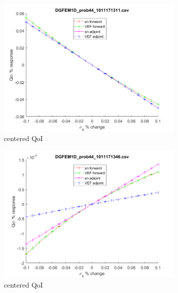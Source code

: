 \documentclass[12pt]{report}
\begin{document}
\begin{figure}[H]
\\
\begin{subfigure}{.5\textwidth}
  \centering
  \includegraphics[width=.98\linewidth]{figures/44sigaSens.png}
  \caption{centered QoI}
  \label{fig:sfig2}
\end{subfigure}%
\begin{subfigure}{.5\textwidth}
  \centering
  \includegraphics[width=.98\linewidth]{figures/44sigsSens.png}
  \caption{centered QoI}
  \label{fig:sfig5}
\end{subfigure}%
\\
\begin{subfigure}{.5\textwidth}
  \centering

\end{subfigure}
\end{figure}
\end{document}
